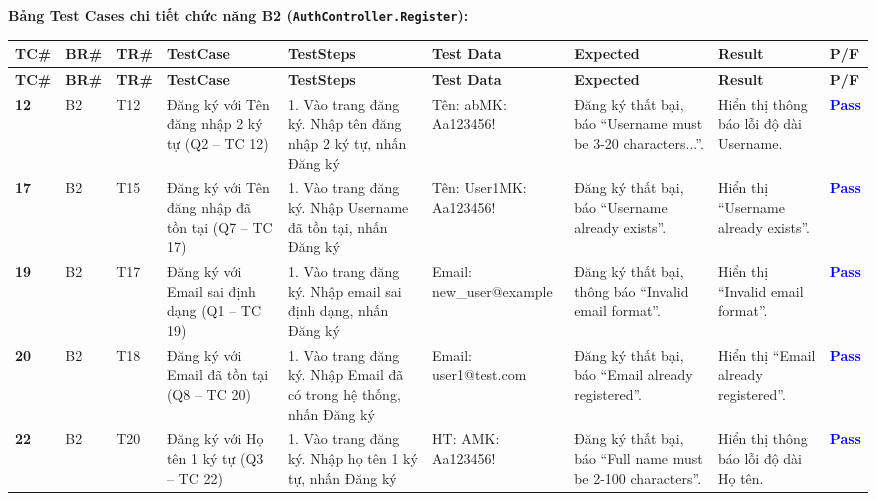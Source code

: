 \documentclass[11pt,a4paper]{article}
\begin{document}
\noindent\textbf{Bảng Test Cases chi tiết chức năng B2 (\texttt{AuthController.Register}):}
\begingroup
\scriptsize
\setlength{\tabcolsep}{3pt}
\begin{longtable}{|C{0.8cm}|C{0.75cm}|C{0.95cm}|L{2.0cm}|L{3.0cm}|L{2.25cm}|L{2.6cm}|L{2.5cm}|C{0.85cm}|}
\hline
{}
\textbf{TC\#} & \textbf{BR\#} & \textbf{TR\#} & \textbf{TestCase} & \textbf{TestSteps} & \textbf{Test Data} & \textbf{Expected} & \textbf{Result} & \textbf{P/F} \tabularnewline
\hline
\endfirsthead
\hline
{}
\textbf{TC\#} & \textbf{BR\#} & \textbf{TR\#} & \textbf{TestCase} & \textbf{TestSteps} & \textbf{Test Data} & \textbf{Expected} & \textbf{Result} & \textbf{P/F} \tabularnewline
\hline
\endhead
\hline
\endfoot
\textbf{12} & B2 & T12 & Đăng ký với Tên đăng nhập 2 ký tự (Q2 -- TC 12) & 1. Vào trang đăng ký. Nhập tên đăng nhập 2 ký tự, nhấn Đăng ký & Tên: ab\newline MK: Aa123456! & Đăng ký thất bại, báo ``Username must be 3-20 characters...''. & Hiển thị thông báo lỗi độ dài Username. & \textcolor{blue}{\textbf{Pass}} \\ \hline
\textbf{17} & B2 & T15 & Đăng ký với Tên đăng nhập đã tồn tại (Q7 -- TC 17) & 1. Vào trang đăng ký. Nhập Username đã tồn tại, nhấn Đăng ký & Tên: User1\newline MK: Aa123456! & Đăng ký thất bại, báo ``Username already exists''. & Hiển thị ``Username already exists''. & \textcolor{blue}{\textbf{Pass}} \\ \hline
\textbf{19} & B2 & T17 & Đăng ký với Email sai định dạng (Q1 -- TC 19) & 1. Vào trang đăng ký. Nhập email sai định dạng, nhấn Đăng ký & Email: new\_user@example & Đăng ký thất bại, thông báo ``Invalid email format''. & Hiển thị ``Invalid email format''. & \textcolor{blue}{\textbf{Pass}} \\ \hline
\textbf{20} & B2 & T18 & Đăng ký với Email đã tồn tại (Q8 -- TC 20) & 1. Vào trang đăng ký. Nhập Email đã có trong hệ thống, nhấn Đăng ký & Email: user1@test.com & Đăng ký thất bại, báo ``Email already registered''. & Hiển thị ``Email already registered''. & \textcolor{blue}{\textbf{Pass}} \\ \hline
\textbf{22} & B2 & T20 & Đăng ký với Họ tên 1 ký tự (Q3 -- TC 22) & 1. Vào trang đăng ký. Nhập họ tên 1 ký tự, nhấn Đăng ký & HT: A\newline MK: Aa123456! & Đăng ký thất bại, báo ``Full name must be 2-100 characters''. & Hiển thị thông báo lỗi độ dài Họ tên. & \textcolor{blue}{\textbf{Pass}} \\ \hline

\end{longtable}
\end{document}
